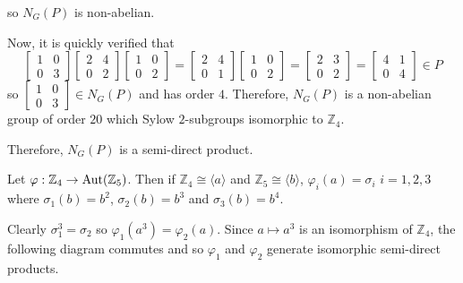 \documentclass[12pt]{AlgebraQual}
\begin{document}
\begin{solution}
\begin{enumerate}[label=(\alph*)]
    so $N_G(P)$ is non-abelian.

    Now, it is quickly verified that $$\begin{bmatrix}
    1 & 0\\
    0 & 3
    \end{bmatrix}\begin{bmatrix}
    2 & 4\\
    0 & 2
    \end{bmatrix}\begin{bmatrix}
    1 & 0\\
    0 & 2
    \end{bmatrix}=\begin{bmatrix}
    2 & 4\\
    0 & 1
    \end{bmatrix}\begin{bmatrix}
    1 & 0\\
    0 & 2
    \end{bmatrix}=\begin{bmatrix}
    2 & 3\\
    0 & 2
    \end{bmatrix}=\begin{bmatrix}
    4 & 1\\
    0 & 4
    \end{bmatrix}\in P$$ so $\begin{bmatrix}
    1 & 0\\
    0 & 3
    \end{bmatrix}\in N_G(P)$ and has order $4$. Therefore, $N_G(P)$ is a non-abelian group of order $20$ which Sylow $2$-subgroups isomorphic to $\mathbb{Z}_4$.

    Therefore, $N_G(P)$ is a semi-direct product.

    Let $\varphi:\mathbb{Z}_4\to\text{Aut}(\mathbb{Z}_5)$. Then if $\mathbb{Z}_4\cong\langle a\rangle$ and $\mathbb{Z}_5\cong\langle b\rangle$, $\varphi_i(a)=\sigma_i$ $i=1,2,3$ where $\sigma_1(b)=b^2$, $\sigma_2(b)=b^3$ and $\sigma_3(b)=b^4$.

    Clearly $\sigma_1^3=\sigma_2$ so $\varphi_1(a^3)=\varphi_2(a)$. Since $a\mapsto a^3$ is an isomorphism of $\mathbb{Z}_4$, the following diagram commutes and so $\varphi_1$ and $\varphi_2$ generate isomorphic semi-direct products.
    \begin{center}
    \end{center}


\end{enumerate}
\end{solution}
\end{document}
